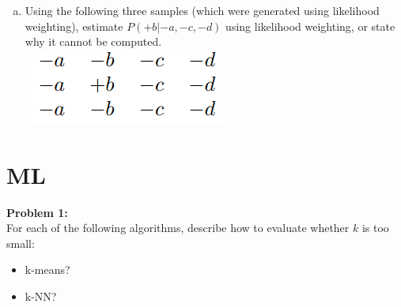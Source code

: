 \documentclass[a4paper]{article}
\newif\ifsol
\begin{document}
\begin{enumerate}[a)]
        \item Using the following three samples (which were generated using likelihood weighting), estimate $P(+b | −a, −c, −d)$ using likelihood weighting, or state why it cannot be computed.\\
        \includegraphics[scale=0.4]{figs/samples2.png}\\
        \ifsol {\color{blue} We compute the weights of each solution, which are the product of the probabilities of the evidence variables conditioned on their parents.
        $$w1 = w3 = P(−a)P(−c | −b)P(−d | −b) = 4/5 ∗ 3/5 ∗ 1/5 = 12/125$$
        $$w2 = P(−a)P(−c | +b)P(−d | +b) = 4/5 ∗ 3/4 ∗ 1/2 = 12/40$$
        so normalizing, we have $(w2)/(w2 + w1 + w3) = \frac{12/40}{12/40+12/125+12/125} = 25/41 ≈ 0.609756$.}
        \else \bigskip \bigskip \bigskip \clearpage
        \fi
    \end{enumerate}
\section{ML}
    \textbf{Problem 1:} \\
    For each of the following algorithms, describe how to evaluate whether $k$ is too small:
    \begin{itemize}
        \item k-means?
        \ifsol 
        {\color{blue}
        In k-means, $k$ determines the number of cluster centroids. If $k$ is too small, there may be a lot of internal structure that is assigned to a single cluster. As a result, there may be high "clustering error" (average distance from points to the cluster centroids) in comparison to slightly larger $k$.
        }
        \else \bigskip \bigskip \bigskip \bigskip \bigskip \bigskip
        \fi
        \bigskip
        
        \item k-NN?
        \ifsol 
        {\color{blue}
        In k-NN, $k$ determines the number of neighbors used to classify a new point. If $k$ is too small, the decision boundary between classes will be very rough/wobbly, and there may be higher error near the decision boundary relative to larger $k$.
        }
        \else \bigskip \bigskip \bigskip \bigskip \bigskip \bigskip
        \fi
    \end{itemize}
    
\end{document}
